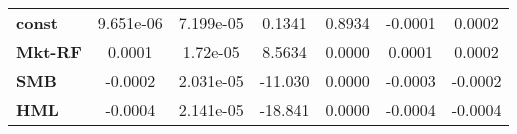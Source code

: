 \begin{center}
\begin{tabular}{lcccccc}
\midrule
\textbf{const}  &     9.651e-06      &     7.199e-05      &      0.1341     &      0.8934      &      -0.0001      &       0.0002       \\
\textbf{Mkt-RF} &       0.0001       &      1.72e-05      &      8.5634     &      0.0000      &       0.0001      &       0.0002       \\
\textbf{SMB}    &      -0.0002       &     2.031e-05      &     -11.030     &      0.0000      &      -0.0003      &      -0.0002       \\
\textbf{HML}    &      -0.0004       &     2.141e-05      &     -18.841     &      0.0000      &      -0.0004      &      -0.0004       \\
\bottomrule
\end{tabular}
\end{center}
